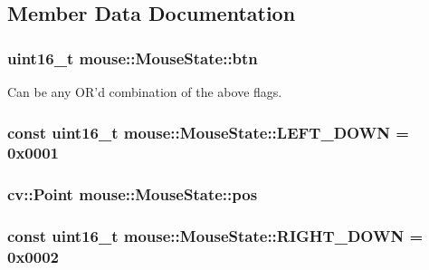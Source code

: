 \subsection{Member Data Documentation}
\hypertarget{structmouse_1_1_mouse_state_ae505c54daeb33d1dd261d68a62ae0814}{
\subsubsection[{btn}]{\setlength{\rightskip}{0pt plus 5cm}uint16\-\_\-t {\bf mouse\-::\-Mouse\-State\-::btn}}}\label{structmouse_1_1_mouse_state_ae505c54daeb33d1dd261d68a62ae0814}
Can be any O\-R'd combination of the above flags. \hypertarget{structmouse_1_1_mouse_state_a9490a7acba9726f815fa3246985da50b}{
\subsubsection[{L\-E\-F\-T\-\_\-\-D\-O\-W\-N}]{\setlength{\rightskip}{0pt plus 5cm}const uint16\-\_\-t {\bf mouse\-::\-Mouse\-State\-::\-L\-E\-F\-T\-\_\-\-D\-O\-W\-N} = 0x0001}}\label{structmouse_1_1_mouse_state_a9490a7acba9726f815fa3246985da50b}
\hypertarget{structmouse_1_1_mouse_state_a7fc14c654b8dda63143c017b86ff6a66}{
\subsubsection[{pos}]{\setlength{\rightskip}{0pt plus 5cm}cv\-::\-Point {\bf mouse\-::\-Mouse\-State\-::pos}}}\label{structmouse_1_1_mouse_state_a7fc14c654b8dda63143c017b86ff6a66}
\hypertarget{structmouse_1_1_mouse_state_a23bf52536a66f3ca8f3d1cebb0f401ee}{
\subsubsection[{R\-I\-G\-H\-T\-\_\-\-D\-O\-W\-N}]{\setlength{\rightskip}{0pt plus 5cm}const uint16\-\_\-t {\bf mouse\-::\-Mouse\-State\-::\-R\-I\-G\-H\-T\-\_\-\-D\-O\-W\-N} = 0x0002}}\label{structmouse_1_1_mouse_state_a23bf52536a66f3ca8f3d1cebb0f401ee}
